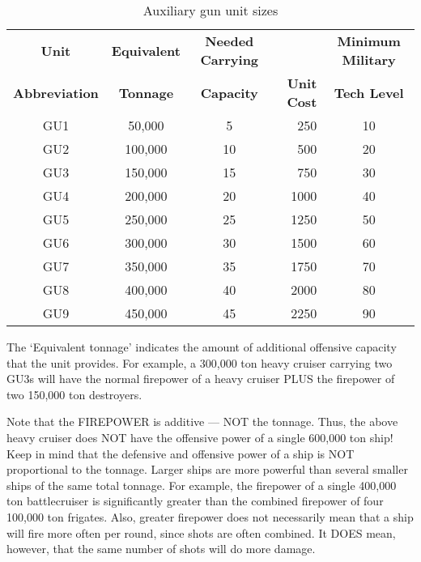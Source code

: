 \documentclass[10pt,titlepage]{article}
\begin{document}
\begin{table}[h]
\begin{center}
\begin{tabular}{|cccrc|}
\hline
  \rowcolor{lightblue} \textbf{Unit}&  \textbf{Equivalent}  & \textbf{Needed Carrying}  &                & \textbf{Minimum Military}  \\
\rowcolor{lightblue} \textbf{Abbreviation} &    \textbf{Tonnage}   & \textbf{Capacity} &   \textbf{Unit Cost}&   \textbf{Tech Level}\\
\hline
        GU1       &       50,000      &     5       &      250    &    10 \\
        GU2       &      100,000      &     10      &      500    &    20 \\
        GU3       &      150,000      &     15      &      750    &    30 \\
        GU4       &      200,000      &     20      &      1000   &    40 \\
        GU5       &      250,000      &     25      &      1250   &    50 \\
        GU6       &      300,000      &     30      &      1500   &    60 \\
        GU7       &      350,000      &     35      &      1750   &    70 \\
        GU8       &      400,000      &     40      &      2000   &    80 \\
        GU9       &      450,000      &     45      &      2250   &    90 \\
\hline
\end{tabular}
\caption{Auxiliary gun unit sizes}
\label{tab:auxguns}
\end{center}
\end{table}

The `Equivalent tonnage' indicates the amount of additional offensive capacity
that the unit provides.  For example, a 300,000 ton heavy cruiser carrying two
GU3s will have the normal firepower of a heavy cruiser PLUS the firepower of
two 150,000 ton destroyers.

\begin{informationnote}
Note that the FIREPOWER is additive --- NOT the tonnage.  Thus, the above
heavy cruiser does NOT have the offensive power of a single 600,000 ton
ship!  Keep in mind that the defensive and offensive power of a ship is NOT
proportional to the tonnage.  Larger ships are more powerful than several
smaller ships of the same total tonnage.  For example, the firepower of a
single 400,000 ton battlecruiser is significantly greater than the combined
firepower of four 100,000 ton frigates.  Also, greater firepower does not
necessarily mean that a ship will fire more often per round, since shots are
often combined.  It DOES mean, however, that the same number of shots will
do more damage.
\end{informationnote}
\end{document}
